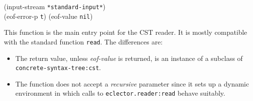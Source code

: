  {\optional (input-stream \texttt{*standard-input*})\\
  (eof-error-p \texttt{t})
  (eof-value \texttt{nil})}

This function is the main entry point for the CST reader.  It is
mostly compatible with the standard \commonlisp{} function
\texttt{read}.  The differences are:

\begin{itemize}
\item The return value, unless \textit{eof-value} is returned, is an
  instance of a subclass of \texttt{concrete-syntax-tree:cst}.
\item The function does not accept a \textit{recursive} parameter
  since it sets up a dynamic environment in which calls to
  \texttt{eclector.reader:read} behave suitably.
\end{itemize}
